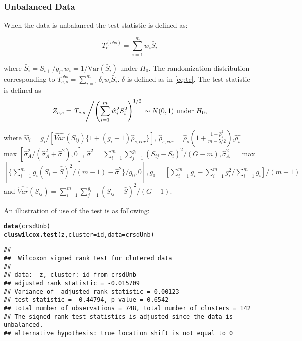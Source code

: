 \documentclass[nojss]{jss}\usepackage[]{graphicx}\usepackage[]{color}
\makeatletter
\newcommand{\hlstd}[1]{\textcolor[rgb]{0.345,0.345,0.345}{#1}}%
\newcommand{\hlkwc}[1]{\textcolor[rgb]{0.333,0.667,0.333}{#1}}%
\newcommand{\hlkwd}[1]{\textcolor[rgb]{0.737,0.353,0.396}{\textbf{#1}}}%
\newenvironment{kframe}{%
 \def\at@end@of@kframe{}%
 \ifinner\ifhmode%
  \def\at@end@of@kframe{\end{minipage}}%
  \begin{minipage}{\columnwidth}%
 \fi\fi%
 \def\FrameCommand##1{\hskip\@totalleftmargin \hskip-\fboxsep
 \colorbox{shadecolor}{##1}\hskip-\fboxsep
     \hskip-\linewidth \hskip-\@totalleftmargin \hskip\columnwidth}%
 \MakeFramed {\advance\hsize-\width
   \@totalleftmargin\z@ \linewidth\hsize
   \@setminipage}}%
 {\par\unskip\endMakeFramed%
 \at@end@of@kframe}
\newenvironment{knitrout}{}{} %
\makeatother
\begin{document}
\subsubsection{Unbalanced Data}
\label{ubsign}
When the data is unbalanced
the test statistic is defined as:

\begin{equation}
T_c^{(obs)} = \sum_{i = 1}^m w_i\bar{S}_i
\end{equation}

where $\bar{S}_i = S_{i+}/{g_i}, w_i = 1/\text{Var}(\bar{S}_i)$ under $H_0$.
The randomization distribution
corresponding to
$T_{c,s}^{obs} = \sum^m_{i=1}\delta_iw_i\bar{S}_i$.
$\delta$ is defined as in \eqref{eq:tc}.
The test statistic is defined as
\begin{equation}
Z_{c,s} = \left.T_{c,s}\middle/ \left(\sum_{i=1}^m\hat{w}^2_i\bar{S}^2_i\right)^{1/2}\right. \sim N(0,1) \text{ under }H_0,
\end{equation}

where $\hat{w}_i = g_i/[\widehat{Var}(S_{ij})\{1 + (g_i-1)\hat{\rho}_{s,cor}\}]$, $\hat{\rho}_{s,cor} = \hat{\rho}_s\left(1 + \frac{1 - \hat{\rho}_s^2}{m - 5/2}\right)$,$\hat{\rho_s} = $ max $[\hat{\sigma}_A^2/(\hat{\sigma}_A^2 + \hat{\sigma}^2), 0]$, $\hat{\sigma
}^2 = \sum_{i=1}^m\sum_{j=1}^{g_i}(S_{ij} - \bar{S}_i)^2/(G-m), \hat{\sigma}^2_A = $ max $[\{\sum_{i=1}^mg_i(\bar{S_i}- \bar{\bar{S}})^2/(m-1)- \hat{\sigma}^2\}/g_0,0], g_0 = [\sum_{i=1}^mg_i - \sum_{i=1}^mg_i^2/\sum_{i=1}^mg_i]/(m-1)$ and $\widehat{Var}(S_{ij}) = \sum_{i=1}^m\sum_{j=1}^{g_i}(S_{ij} - \bar{\bar{S}})^2/(G-1)$.

An illustration of use of the test is as following:
\begin{knitrout}
\color{fgcolor}\begin{kframe}
\begin{alltt}
\hlkwd{data}\hlstd{(crsdUnb)}
\hlkwd{cluswilcox.test}\hlstd{(z,} \hlkwc{cluster} \hlstd{= id,} \hlkwc{data} \hlstd{= crsdUnb)}
\end{alltt}
\begin{verbatim}
## 
## 	Wilcoxon signed rank test for clutered data
## 
## data:  z, cluster: id from crsdUnb
## adjusted rank statistic = -0.015709
## Variance of  adjusted rank statistic = 0.00123
## test statistic = -0.44794, p-value = 0.6542
## total number of observations = 748, total number of clusters = 142
## The signed rank test statistics is adjusted since the data is unbalanced.
## alternative hypothesis: true location shift is not equal to 0
\end{verbatim}
\end{kframe}
\end{knitrout}
\end{document}
